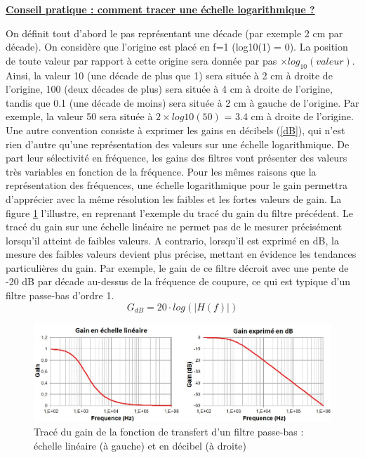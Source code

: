 	\textbf{\underline{Conseil pratique : comment tracer une échelle logarithmique ?}}
	
	On définit tout d'abord le pas représentant une décade (par exemple 2 cm par décade). On considère que l'origine est placé en f=1 (log10(1) = 0). La position de toute valeur par rapport à cette origine sera donnée par pas $\times log_{10}(valeur)$. Ainsi, la valeur 10 (une décade de plus que 1) sera située à 2 cm à droite de l'origine, 100 (deux décades de plus) sera située à 4 cm à droite de l'origine, tandis que 0.1 (une décade de moins) sera située à 2 cm à gauche de l'origine. Par exemple, la valeur 50 sera située à $2\times log10(50)$ = 3.4 cm à droite de l'origine.\\
	
	Une autre convention consiste à exprimer les gains en décibels (\ref{dB}), qui n'est rien d'autre qu'une représentation des valeurs sur une échelle logarithmique. De part leur sélectivité en fréquence, les gains des filtres vont présenter des valeurs très variables en fonction de la fréquence. Pour les mêmes raisons que la représentation des fréquences, une échelle logarithmique pour le gain permettra d'apprécier avec la même résolution les faibles et les fortes valeurs de gain. La figure \ref{Fig:Effet_Ylin_dB} l'illustre, en reprenant l'exemple du tracé du gain du filtre précédent. Le tracé du gain sur une échelle linéaire ne permet pas de le mesurer précisément lorsqu'il atteint de faibles valeurs. A contrario, lorsqu'il est exprimé en dB, la mesure des faibles valeurs devient plus précise, mettant en évidence les tendances particulières du gain. Par exemple, le gain de ce filtre décroit avec une pente de -20 dB par décade au-dessus de la fréquence de coupure, ce qui est typique d'un filtre passe-bas d'ordre 1. 
	\begin{equation}\label{dB}
	G_{dB} = 20 \cdot log(|H(f)|)
	\end{equation}
	
	\begin{figure}[h!]
		\centering
		\includegraphics[scale=0.6]{images/Effet_Ylin_dB.jpg}
		\caption{Tracé du gain de la fonction de transfert d'un filtre passe-bas : échelle linéaire (à gauche) et en décibel (à droite)}	
		\label{Fig:Effet_Ylin_dB} 
	\end{figure}
	
